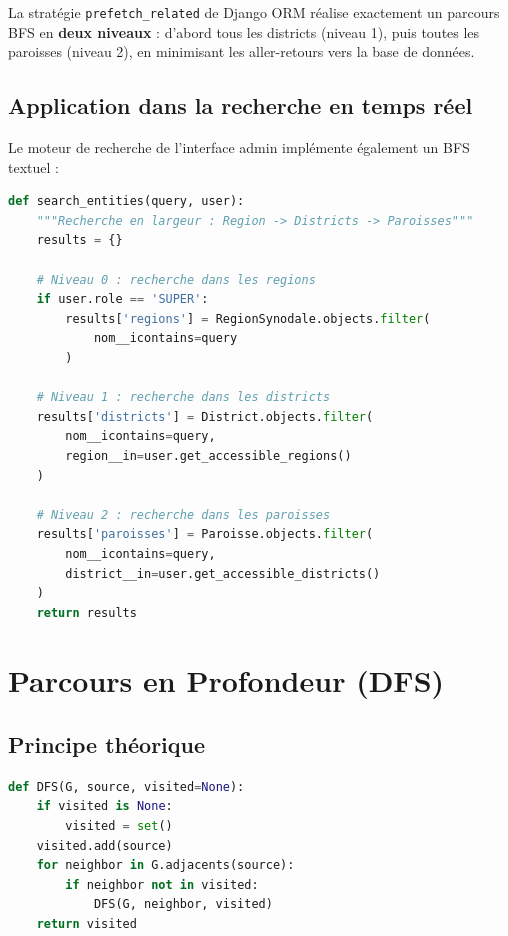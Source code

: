 \documentclass[12pt, a4paper]{report}
\theoremstyle{definition}
\begin{document}
La stratégie \texttt{prefetch\_related} de Django ORM réalise exactement un parcours BFS en \textbf{deux niveaux} : d'abord tous les districts (niveau 1), puis toutes les paroisses (niveau 2), en minimisant les aller-retours vers la base de données.

\subsection{Application dans la recherche en temps réel}

Le moteur de recherche de l'interface admin implémente également un BFS textuel :

\begin{lstlisting}[language=Python, caption=Recherche BFS textuelle sur le graphe hiérarchique]
def search_entities(query, user):
    """Recherche en largeur : Region -> Districts -> Paroisses"""
    results = {}

    # Niveau 0 : recherche dans les regions
    if user.role == 'SUPER':
        results['regions'] = RegionSynodale.objects.filter(
            nom__icontains=query
        )

    # Niveau 1 : recherche dans les districts
    results['districts'] = District.objects.filter(
        nom__icontains=query,
        region__in=user.get_accessible_regions()
    )

    # Niveau 2 : recherche dans les paroisses
    results['paroisses'] = Paroisse.objects.filter(
        nom__icontains=query,
        district__in=user.get_accessible_districts()
    )
    return results
\end{lstlisting}

\section{Parcours en Profondeur (DFS)}

\subsection{Principe théorique}

\begin{tcolorbox}[algobox, title=Algorithme DFS (Depth-First Search)]
\begin{lstlisting}[language=Python, numbers=none]
def DFS(G, source, visited=None):
    if visited is None:
        visited = set()
    visited.add(source)
    for neighbor in G.adjacents(source):
        if neighbor not in visited:
            DFS(G, neighbor, visited)
    return visited
\end{lstlisting}
\end{tcolorbox}
\end{document}
